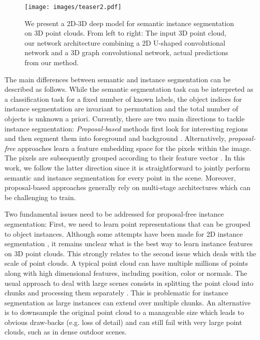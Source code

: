 \documentclass[runningheads]{llncs}
\begin{document}
\begin{figure}[t!]
	\centering
	\texttt{[image: images/teaser2.pdf]}
	\caption{We present a 2D-3D deep model for semantic instance segmentation on 3D point clouds.
	From left to right: The input 3D point cloud, our network architecture combining a 2D U-shaped convolutional network and a 3D graph convolutional network, actual predictions from our method.}
	\label{fig:teaser}
\end{figure}

The main differences between semantic and instance segmentation can be described as follows.
While the semantic segmentation task can be interpreted as a classification task for a fixed number of known labels,
the object indices for instance segmentation are invariant to permutation and the total number of objects is unknown a priori.
Currently, there are two main directions to tackle instance segmentation:
\textit{Proposal-based} methods first look for interesting regions and then segment them into foreground and background \cite{Pinheiro15NIPS,Dai15CoRR,He17ICCV}.
Alternatively, \textit{proposal-free} approaches learn a feature embedding space for the pixels within the image.
The pixels are subsequently grouped according to their feature vector \cite{Newell17NIPS,Hsu18IJCNN,Kong18CVPR}.
In this work, we follow the latter direction since it is straightforward to jointly perform semantic and instance segmentation for every point in the scene.
Moreover, proposal-based approaches generally rely on multi-stage architectures which can be challenging to train.

Two fundamental issues need to be addressed for proposal-free instance segmentation:
First, we need to learn point representations that can be grouped to object instances.
Although some attempts have been made for 2D instance segmentation \cite{Kong18CVPR,Brabandere17CVPRW,Newell17NIPS},
it remains unclear what is the best way to learn instance features on 3D point clouds.
This strongly relates to the second issue which deals with the scale of point clouds.
A typical point cloud can have multiple millions of points along with high dimensional features, including position, color or normals.
The usual approach to deal with large scenes consists in splitting the point cloud into chunks and processing them separately \cite{Qi17CVPR,Qi17NIPS,Wang18CVPR}.
This is problematic for instance segmentation as large instances can extend over multiple chunks.
An alternative is to downsample the original point cloud to a manageable size \cite{Tatarchenko18CVPR} which leads to obvious draw-backs (e.g. loss of detail) and can still fail with very large point clouds, such as in dense outdoor scenes.
\end{document}
